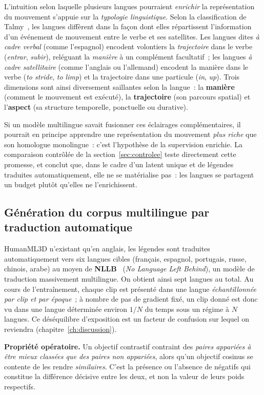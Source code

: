 \documentclass[12pt,a4paper,oneside]{report}
\theoremstyle{definition}
\theoremstyle{plain}
\begin{document}
L'intuition selon laquelle plusieurs langues pourraient \emph{enrichir} la
représentation du mouvement s'appuie sur la \emph{typologie linguistique}. Selon la
classification de Talmy~\cite{talmy2000}, les langues diffèrent dans la façon dont elles répartissent
l'information d'un événement de mouvement entre le verbe et ses satellites. Les
langues dites \emph{à cadre verbal} (comme l'espagnol) encodent volontiers la
\emph{trajectoire} dans le verbe (\emph{entrar}, \emph{subir}), reléguant la
\emph{manière} à un complément facultatif~; les langues \emph{à cadre satellitaire}
(comme l'anglais ou l'allemand) encodent la manière dans le verbe
(\emph{to stride}, \emph{to limp}) et la trajectoire dans une particule
(\emph{in}, \emph{up}). Trois dimensions sont ainsi diversement saillantes selon la
langue~: la \textbf{manière} (comment le mouvement est exécuté), la
\textbf{trajectoire} (son parcours spatial) et l'\textbf{aspect} (sa structure
temporelle, ponctuelle ou durative).

Si un modèle multilingue savait fusionner ces éclairages complémentaires, il
pourrait en principe apprendre une représentation du mouvement \emph{plus riche}
que son homologue monolingue~: c'est l'hypothèse de la supervision enrichie. La
comparaison contrôlée de la section~\ref{sec:controlee} teste directement cette
promesse, et conclut que, dans le cadre d'un latent unique et de légendes traduites
automatiquement, elle ne se matérialise pas~: les langues se partagent un budget
plutôt qu'elles ne l'enrichissent.

\subsection{Génération du corpus multilingue par traduction automatique}

HumanML3D n'existant qu'en anglais, les légendes sont traduites automatiquement
vers six langues cibles (français, espagnol, portugais, russe, chinois, arabe)
au moyen de \textbf{NLLB}~\cite{nllb2022} (\emph{No Language Left Behind}), un
modèle de traduction massivement multilingue. On obtient ainsi sept langues au
total. Au cours de l'entraînement, chaque clip est présenté dans une langue
\emph{échantillonnée par clip et par époque}~; à nombre de pas de gradient fixé,
un clip donné est donc vu dans une langue déterminée environ $1/N$ du temps sous
un régime à $N$ langues. Ce déséquilibre d'exposition est un facteur de confusion
sur lequel on reviendra (chapitre~\ref{ch:discussion}).

\begin{encadre}
\textbf{Propriété opératoire.} Un objectif contrastif contraint des \emph{paires
appariées à être mieux classées que des paires non appariées}, alors qu'un
objectif cosinus se contente de les rendre \emph{similaires}. C'est la présence
ou l'absence de négatifs qui constitue la différence décisive entre les deux, et
non la valeur de leurs poids respectifs.
\end{encadre}
\end{document}
